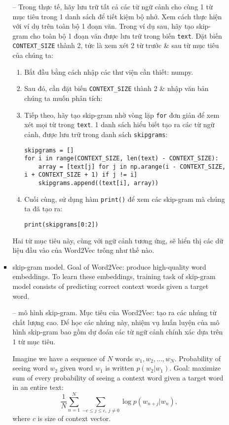 \documentclass{article}
\begin{document}
\begin{itemize}
\begin{itemize}
\begin{itemize}
            -- Trong thực tế, hãy lưu trữ tất cả các từ ngữ cảnh cho cùng 1 từ mục tiêu trong 1 danh sách để tiết kiệm bộ nhớ. Xem cách thực hiện với ví dụ trên toàn bộ 1 đoạn văn. Trong ví dụ sau, hãy tạo skip-gram cho toàn bộ 1 đoạn văn được lưu trữ trong biến {\tt text}. Đặt biến \verb|CONTEXT_SIZE| thành 2, tức là xem xét 2 từ trước \& sau từ mục tiêu của chúng ta:
            \begin{enumerate}
                \item Bắt đầu bằng cách nhập các thư viện cần thiết: numpy.
                \item Sau đó, cần đặt biến \verb|CONTEXT_SIZE| thành 2 \& nhập văn bản chúng ta muốn phân tích:
                \item Tiếp theo, hãy tạo skip-gram nhờ vòng lặp {\tt for} đơn giản để xem xét mọi từ trong {\tt text}. 1 danh sách hiểu biết tạo ra các từ ngữ cảnh, được lưu trữ trong danh sách {\tt skipgrams}:
                \begin{verbatim}
skipgrams = []
for i in range(CONTEXT_SIZE, len(text) - CONTEXT_SIZE):
    array = [text[j] for j in np.arange(i - CONTEXT_SIZE, i + CONTEXT_SIZE + 1) if j != i]
    skipgrams.append((text[i], array))
                \end{verbatim}
                \item Cuối cùng, sử dụng hàm {\tt print()} để xem các skip-gram mà chúng ta đã tạo ra:
                \begin{verbatim}
print(skipgrams[0:2])
                \end{verbatim}
            \end{enumerate}
            Hai từ mục tiêu này, cùng với ngữ cảnh tương ứng, sẽ hiển thị các dữ liệu đầu vào của Word2Vec trông như thế nào.
            \item {\sf skip-gram model.} Goal of Word2Vec: produce high-quality word embeddings. To learn these embeddings, training task of skip-gram model consists of predicting correct context words given a target word.

            -- {\sf mô hình skip-gram.} Mục tiêu của Word2Vec: tạo ra các nhúng từ chất lượng cao. Để học các nhúng này, nhiệm vụ huấn luyện của mô hình skip-gram bao gồm dự đoán các từ ngữ cảnh chính xác dựa trên 1 từ mục tiêu.

            Imagine we have a sequence of $N$ words $w_1,w_2,\ldots,w_N$. Probability of seeing word $w_2$ given word $w_1$ is written $p(w_2|w_1)$. Goal: maximize sum of every probability of seeing a context word given a target word in an entire text:
            \begin{equation*}
                \frac{1}{N}\sum_{n=1}^N\sum_{-c\le j\le c,\ j\ne0} \log p(w_{n+j}|w_n),
            \end{equation*}
            where $c$ is size of context vector.


\end{itemize}
\end{itemize}
\end{itemize}
\end{document}
